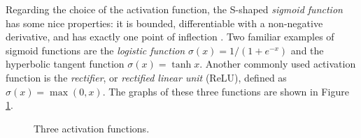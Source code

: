 \documentclass[a4paper,11pt,titlepage]{article}
\theoremstyle{definition}
\theoremstyle{plain}
\theoremstyle{remark}
\begin{document}
Regarding the choice of the activation function, the S-shaped \textit{sigmoid function} has some nice properties: it is bounded, differentiable with a non-negative derivative, and has exactly one point of inflection \cite{HanMoraga}. Two familiar examples of sigmoid functions are the \textit{logistic function} $\sigma(x)=1/\left(1+e^{-x}\right)$ and the hyperbolic tangent function $\sigma(x)=\tanh x$. Another commonly used activation function is the \textit{rectifier}, or \textit{rectified linear unit} (ReLU), defined as $\sigma(x)=\max(0, x)$. The graphs of these three functions are shown in Figure \ref{fig:actfun}.

\begin{figure}[htbp]
    \centering
    \begin{minipage}{0.32\textwidth}
        \centering
    \end{minipage}
    \hfill
    \begin{minipage}{0.32\textwidth}
        \centering
    \end{minipage}
    \hfill
    \begin{minipage}{0.32\textwidth}
        \centering
    \end{minipage}
    \centering
    \caption{Three activation functions.}
    \label{fig:actfun}
\end{figure}
\end{document}
